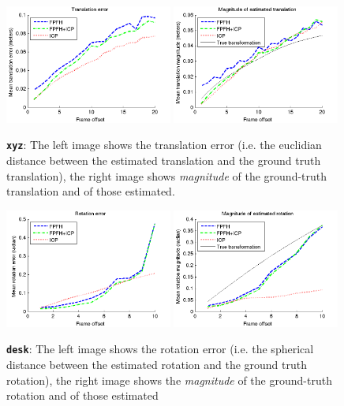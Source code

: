 \documentclass[a4paper]{article}
\begin{document}
\begin{figure}[H]
    \centering
        \includegraphics[width=0.49\textwidth]{ims/xyzTranslationerror.png}
        \includegraphics[width=0.49\textwidth]{ims/xyzMagnitudeofestimatedtranslation.png}
    \caption{\textbf{\texttt{xyz}}: The left image shows the translation error (i.e. the euclidian distance between the estimated translation and the ground truth translation), the right image shows \emph{magnitude} of the ground-truth translation and of those estimated.}
    \label{fig:xyz_translation}
\end{figure}

\begin{figure}[H]
    \centering
        \includegraphics[width=0.49\textwidth]{ims/deskRotationerror.png}
        \includegraphics[width=0.49\textwidth]{ims/deskMagnitudeofestimatedrotation.png}
    \caption{\textbf{\texttt{desk}}: The left image shows the rotation error (i.e. the spherical distance between the estimated rotation and the ground truth rotation), the right image shows the \emph{magnitude} of the ground-truth rotation and of those estimated}
    \label{fig:desk_rotation}
\end{figure}
\end{document}

